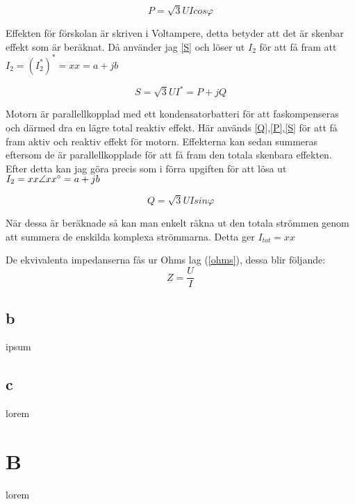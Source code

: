 \documentclass{article}
\begin{document}
  \begin{equation}
    P=\sqrt3UIcos\varphi
    \label{P}
  \end{equation}

  Effekten för förskolan är skriven i Voltampere, detta betyder att det är skenbar effekt som är beräknat.
  Då använder jag \ref{S} och löser ut $I_2$ för att få fram att $I_2=(I_2^*)^*=xx=a+jb$

  \begin{equation}
    S=\sqrt3UI^*=P+jQ
    \label{S}
  \end{equation}

  Motorn är parallellkopplad med ett kondensatorbatteri för att faskompenseras och därmed dra en lägre total reaktiv effekt.
  Här används \ref{Q},\ref{P},\ref{S} för att få fram aktiv och reaktiv effekt för motorn.
  Effekterna kan sedan summeras eftersom de är parallellkopplade för att få fram den totala skenbara effekten.
  Efter detta kan jag göra precis som i förra upgiften för att lösa ut $I_2=xx\angle{xx\degree}=a+jb$

  \begin{equation}
    Q=\sqrt3UIsin\varphi
    \label{Q}
  \end{equation}

  När dessa är beräknade så kan man enkelt räkna ut den totala strömmen genom att summera de enskilda komplexa strömmarna.
  Detta ger $I_{tot}=xx$


  De ekvivalenta impedanserna fås ur Ohms lag (\ref{ohms}), dessa blir följande:
  \begin{equation}
    Z=\frac{U}{I}
    \label{ohms}
  \end{equation}


\subsection{b}
ipsum
\subsection{c}
lorem
\section{B}
lorem
\end{document}
